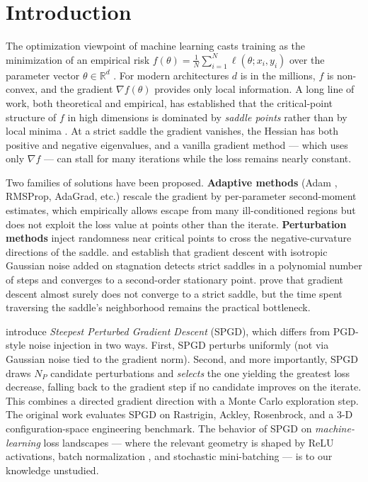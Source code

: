 \documentclass[11pt]{article}
\newcommand{\np}{\ensuremath{N_P}}
\newcommand{\R}{\mathbb{R}}
\begin{document}
\section{Introduction}
\label{sec:intro}

The optimization viewpoint of machine learning casts training as the
minimization of an empirical risk
$f(\theta) = \frac{1}{N}\sum_{i=1}^{N} \ell(\theta; x_i, y_i)$
over the parameter vector $\theta \in \R^d$
\citep{robbins1951stochastic,goodfellow2016deep}. For modern
architectures $d$ is in the millions, $f$ is non-convex, and the
gradient $\nabla f(\theta)$ provides only local information. A long
line of work, both theoretical and empirical, has established that the
critical-point structure of $f$ in high dimensions is dominated by
\emph{saddle points} rather than by local minima
\citep{dauphin2014saddle,choromanska2015loss}. At a strict saddle the
gradient vanishes, the Hessian has both positive and negative
eigenvalues, and a vanilla gradient method --- which uses only
$\nabla f$ --- can stall for many iterations while the loss remains
nearly constant.

Two families of solutions have been proposed.
\textbf{Adaptive methods} (Adam \citep{kingma2015adam}, RMSProp,
AdaGrad, etc.) rescale the gradient by per-parameter second-moment
estimates, which empirically allows escape from many ill-conditioned
regions but does not exploit the loss value at points other than the
iterate.
\textbf{Perturbation methods} inject randomness near critical points to
cross the negative-curvature directions of the saddle.
\citet{ge2015escaping} and \citet{jin2017escape} establish that
gradient descent with isotropic Gaussian noise added on stagnation
detects strict saddles in a polynomial number of steps and converges
to a second-order stationary point.
\citet{lee2016gradient} prove that gradient descent almost surely does
not converge to a strict saddle, but the time spent traversing the
saddle's neighborhood remains the practical bottleneck.

\citet{vahedi2024spgd} introduce \emph{Steepest Perturbed Gradient
Descent} (SPGD), which differs from PGD-style noise injection in two
ways. First, SPGD perturbs uniformly (not via Gaussian noise tied to
the gradient norm). Second, and more importantly, SPGD draws \np{}
candidate perturbations and \emph{selects} the one yielding the
greatest loss decrease, fall\-ing back to the gradient step if no
candidate improves on the iterate. This combines a directed
gradient direction with a Monte Carlo exploration step. The original
work evaluates SPGD on Rastrigin, Ackley, Rosenbrock, and a 3-D
configuration-space engineering benchmark. The behavior of SPGD on
\emph{machine-learning} loss landscapes --- where the relevant geometry
is shaped by ReLU activations, batch normalization
\citep{ioffe2015batchnorm}, and stochastic mini-batching --- is to our
knowledge unstudied.
\end{document}
